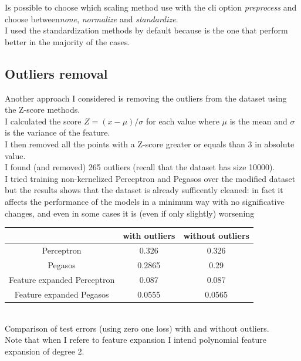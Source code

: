 Is possible to choose which scaling method use with the cli option \textit{\-\-preprocess} and choose between\textit{none}, \textit{normalize} and \textit{standardize}.\\
I used the standardization methods by default because is the one that perform better in the majority of the cases.\\



\subsection{Outliers removal}
Another approach I considered is removing the outliers from the dataset using the Z-score methods.\\
I calculated the score $ Z = (x - \mu) / \sigma$ for each value where $\mu$ is the mean and $\sigma$ is the variance of the feature.\\
I then removed all the points with a Z-score greater or equals than $3$ in absolute value.\\
I found (and removed) 265 outliers (recall that the dataset has size 10000).\\
I tried training non-kernelized Perceptron and Pegasos over the modified dataset but the results shows that the dataset is already sufficently cleaned: in fact it  
affects the performance of the models in a minimum way with no significative changes, and even in some cases it is (even if only slightly) worsening\\

\begin{center}
    \begin{tabular}{| c | c | c |}
    \hline
    & with outliers & without outliers \\
    \hline
    Perceptron & 0.326 & 0.326 \\
    \hline
    Pegasos & 0.2865 &  0.29  \\
    \hline
    Feature expanded Perceptron &  0.087 & 0.087 \\
    \hline
    Feature expanded Pegasos & 0.0555 & 0.0565  \\
    \hline
    \end{tabular}\\
    Comparison of test errors (using zero one loss) with and without outliers.\\
    Note that when I refere to feature expansion I intend polynomial feature expansion of degree 2.\\
\end{center}


